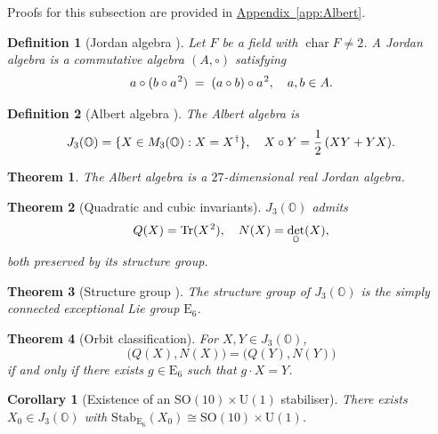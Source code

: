\documentclass[pdflatex,sn-mathphys-num]{sn-jnl}
\theoremstyle{thmstyleone}
\newtheorem{theorem}{Theorem}
\newtheorem{corollary}[corollary]{Corollary}
\theoremstyle{thmstyletwo}%
\theoremstyle{thmstylethree}%
\newtheorem{definition}{Definition}%
\newcommand{\SO}[1]{\mathrm{SO(#1)}}
\newcommand{\U}[1]{\mathrm{U(#1)}}
\newcommand{\E}[1]{\mathrm{E_{#1}}}
\newcommand{\Oct}{\mathbb{O}}
\newcommand{\jalg}{J_3(\mathbb{O})}
\newcommand{\SOTen}{\SO{10}}
\newcommand{\UOne}{\U{1}}
\newcommand{\ESix}{\E{6}}
\newcommand{\SOTenXUOne}{\SOTen \times \UOne}
\newcommand{\Tr}{\operatorname{Tr}}
\newcommand{\sm}{\hspace{.065em}}
\newcommand{\appref}[1]{\hyperref[#1]{Appendix~\ref*{#1}}}
\newcommand{\smexp}[1]{^{\sm #1}}
\begin{document}
Proofs for this subsection are provided in \appref{app:Albert}.

\begin{definition}[Jordan algebra {\cite{Jacobson:1968}}]
Let $F$ be a field with $\operatorname{char} F \neq 2$.  
A \emph{Jordan algebra} is a commutative algebra $(A,\circ)$ satisfying
\[
  a\circ(b\circ a\smexp{2}) \;=\;(a\circ b)\circ a\smexp{2},
  \quad a,b\in A.
\]
\end{definition}

\begin{definition}[Albert algebra {\cite{Albert:1934,McCrimmon:2004}}]
The \emph{Albert algebra} is
\[
  \jalg=\{X\in M_{3}(\Oct) : X=X\smexp{\dagger}\},
  \quad
  X\circ Y=\frac12\,(XY+YX).
\]
\end{definition}

\begin{theorem}\label{thm:JordanDim}
The Albert algebra is a $27$-dimensional real Jordan algebra.
\end{theorem}

\begin{theorem}[Quadratic and cubic invariants]\label{thm:Invs}
$\jalg$ admits  
\[
  Q(X)=\Tr(X\smexp{2}), 
  \quad
  N(X)=\det_{\Oct}(X),
\]
both preserved by its structure group.
\end{theorem}

\begin{theorem}[Structure group {\cite{Springer:2000}}]\label{thm:E6}
The structure group of $\jalg$ is the simply connected exceptional Lie group $\ESix$.
\end{theorem}

\begin{theorem}[Orbit classification]\label{thm:OrbitClass}
For $X,Y\in\jalg$,
\[
  \bigl(Q(X),N(X)\bigr)=\bigl(Q(Y),N(Y)\bigr)
\]
if and only if there exists $g\in\ESix$ such that $g\cdot X = Y$.
\end{theorem}

\begin{corollary}[Existence of an $\SOTenXUOne$ stabiliser]
\label{cor:Isotropy}
There exists $X_{0}\in J_{3}(\mathbb{O})$ with
$\mathrm{Stab}_{\ESix}(X_{0})\cong \SOTen\times \UOne$.
\end{corollary}

\end{document}
